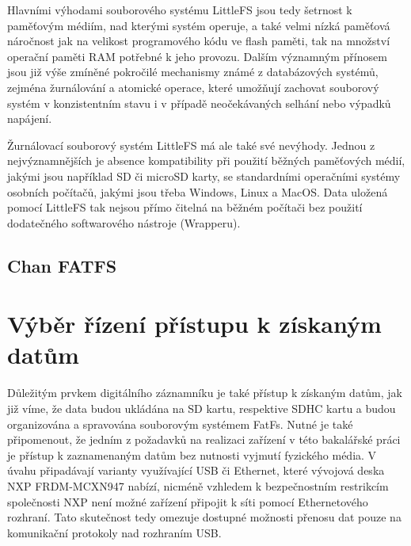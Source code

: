 Hlavními výhodami souborového systému LittleFS jsou tedy šetrnost k paměťovým médiím, nad kterými systém operuje, a také velmi nízká paměťová náročnost jak na velikost programového kódu ve flash paměti, tak na množství operační paměti RAM potřebné k jeho provozu. Dalším významným přínosem jsou již výše zmíněné pokročilé mechanismy známé z databázových systémů, zejména žurnálování a atomické operace, které umožňují zachovat souborový systém v konzistentním stavu i v případě neočekávaných selhání nebo výpadků napájení. \cite{nxp_the_design_of_the_little_filesystem}

Žurnálovací souborový systém LittleFS má ale také své nevýhody. Jednou z nejvýznamnějších je absence kompatibility při použití běžných paměťových médií, jakými jsou například SD či microSD karty, se standardními operačními systémy osobních počítačů, jakými jsou třeba Windows, Linux a MacOS. Data uložená pomocí LittleFS tak nejsou přímo čitelná na běžném počítači bez použití dodatečného softwarového nástroje (Wrapperu). \cite{cnx_software_little_fs}

\subsection{Chan FATFS}




\section{Výběr řízení přístupu k získaným datům}
Důležitým prvkem digitálního záznamníku je také přístup k získaným datům, jak již víme, že data budou ukládána na SD kartu, respektive SDHC kartu a budou organizována a spravována souborovým systémem FatFs. Nutné je také připomenout, že jedním z požadavků na realizaci zařízení v této bakalářské práci je přístup k zaznamenaným datům bez nutnosti vyjmutí fyzického média. V úvahu připadávají varianty využívající USB či Ethernet, které vývojová deska NXP FRDM-MCXN947 nabízí, nicméně vzhledem k bezpečnostním restrikcím společnosti NXP není možné zařízení připojit k síti pomocí Ethernetového rozhraní. Tato skutečnost tedy omezuje dostupné možnosti přenosu dat pouze na komunikační protokoly nad rozhraním USB. 


